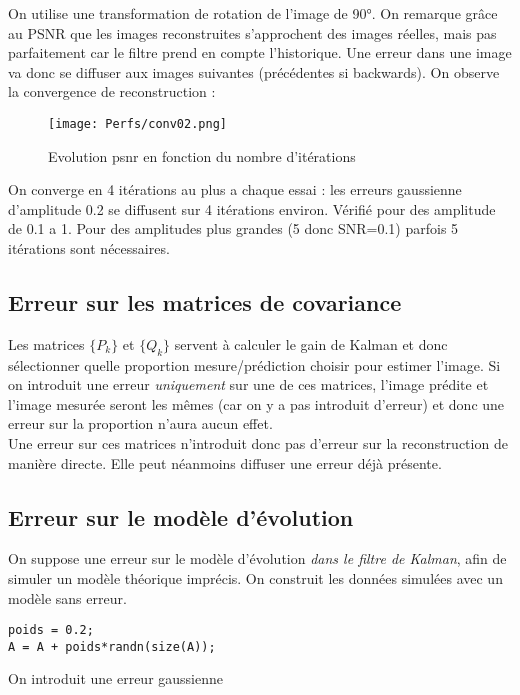 \documentclass[titlepage]{article}
\begin{document}
	On utilise une transformation de rotation de l'image de 90°. On remarque grâce au PSNR que les images reconstruites s'approchent des images réelles, mais pas parfaitement car le filtre prend en compte l'historique. Une erreur dans une image va donc se diffuser aux images suivantes (précédentes si backwards). On observe la convergence de reconstruction :
	
	\begin{figure}[H]
		\centering
		\texttt{[image: Perfs/conv02.png]}
		\caption{Evolution psnr en fonction du nombre d'itérations}
	\end{figure}

	On converge en 4 itérations au plus a chaque essai : les erreurs gaussienne d'amplitude 0.2 se diffusent sur 4 itérations environ.
	Vérifié pour des amplitude de 0.1 a 1. Pour des amplitudes plus grandes (5 donc SNR=0.1) parfois 5 itérations sont nécessaires.
	
	\subsection{Erreur sur les matrices de covariance}
	
	Les matrices $\{P_k\}$ et $\{Q_k\}$ servent à calculer le gain de Kalman et donc sélectionner quelle proportion mesure/prédiction choisir pour estimer l'image. Si on introduit une erreur \emph{uniquement} sur une de ces matrices, l'image prédite et l'image mesurée seront les mêmes (car on y a pas introduit d'erreur) et donc une erreur sur la proportion n'aura aucun effet.\\
	Une erreur sur ces matrices n'introduit donc pas d'erreur sur la reconstruction de manière directe. Elle peut néanmoins diffuser une erreur déjà présente.
	
	\subsection{Erreur sur le modèle d'évolution}
	
	On suppose une erreur sur le modèle d'évolution \emph{dans le filtre de Kalman}, afin de simuler un modèle théorique imprécis. On construit les données simulées avec un modèle sans erreur.\\
	\begin{verbatim}
poids = 0.2;
A = A + poids*randn(size(A));
	\end{verbatim}
	
	On introduit une erreur gaussienne
	
\end{document}
